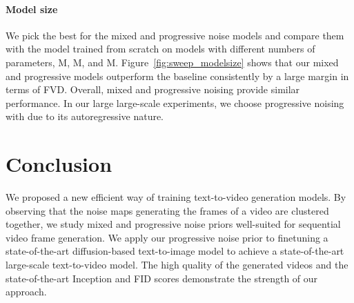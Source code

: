 \documentclass[10pt,twocolumn,letterpaper]{article}
\begin{document}
\paragraph{Model size} 
We pick the best  for the mixed and progressive noise models and compare them with the model trained from scratch on models with different numbers of parameters, M, M, and M.
Figure~\ref{fig:sweep_modelsize} shows that our mixed and progressive models outperform the baseline consistently by a large margin in terms of FVD.
Overall, mixed and progressive noising provide similar performance. 
In our large large-scale experiments, we choose progressive noising with  due to its autoregressive nature.
 
\section{Conclusion}\label{sec:conclusion}

We proposed a new efficient way of training text-to-video generation models.
By observing that the noise maps generating the frames of a video are clustered together, we study mixed and progressive noise priors well-suited for sequential video frame generation. 
We apply our progressive noise prior to finetuning a state-of-the-art diffusion-based text-to-image model to achieve a state-of-the-art large-scale text-to-video model. The high quality of the generated videos and the state-of-the-art Inception and FID scores demonstrate the strength of our approach.







\newcommand{\ModelEffMixedKaalFVD}{
(68, 337.4)
(112, 322.57)
(253, 310.13)
}

\newcommand{\ModelEffProgKaalFVD}{
(68, 339.67)
(112, 322.59)
(253, 298.88)
}

\newcommand{\ModelEffKaalFVD}{
(68, 903.37)
(112, 748.67)
(253, 642.75)
}
 \newcommand{\ModelEffMixedKaalIS}{
(68, 53.52)
(112, 57.93)
(253, 60.01)
}

\newcommand{\ModelEffProgKaalIS}{
(68, 53.52)
(112, 57.31)
(253, 59.82)
}
\end{document}
